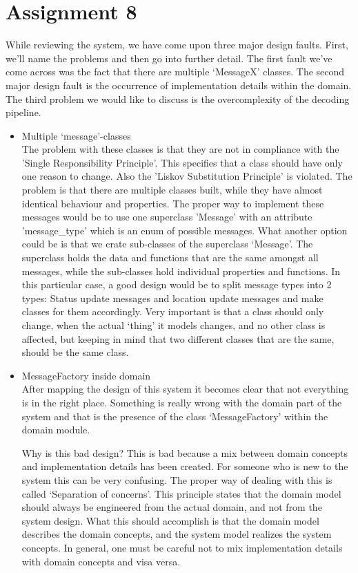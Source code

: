 \documentclass[12pt]{article}
\begin{document}
\section*{Assignment 8}
While reviewing the system, we have come upon three major design faults. First, we'll name the problems and then go into further detail. The first fault we've come across was the fact that there are multiple `MessageX' classes. The second major design fault is the occurrence of implementation details within the domain. The third problem we would like to discuss is the overcomplexity of the decoding pipeline.

\begin{itemize}
\item Multiple `message'-classes\\
The problem with these classes is that they are not in compliance with the 'Single Responsibility Principle'. This specifies that a class should have only one reason to change. Also the 'Liskov Substitution Principle'  is violated. The problem is that there are multiple classes built, while they have almost identical behaviour and properties. The proper way to implement these messages would be to use one superclass 'Message' with an attribute 'message\_type' which is an enum of possible messages. What another option could be is that we crate sub-classes of the superclass `Message'. The superclass holds the data and functions that are the same amongst all messages, while the sub-classes hold individual properties and functions. 
In this particular case, a good design would be to split message types into 2 types: Status update messages and location update messages and make classes for them accordingly. Very important is that a class should only change, when the actual `thing' it models changes, and no other class is affected, but keeping in mind that two different classes that are the same, should be the same class.

\item MessageFactory inside domain\\
After mapping the design of this system it becomes clear that not everything is in the right place. Something is really wrong with the domain part of the system and that is the presence of the class `MessageFactory' within the domain module.

Why is this bad design? 
This is bad because a mix between domain concepts and implementation details has been created. For someone who is new to the system this can be very confusing. The proper way of dealing with this is called `Separation of concerns'. This principle states that the domain model should always be engineered from the actual domain, and not from the system design. What this should accomplish is that the domain model describes the domain concepts, and the system model realizes the system concepts. In general, one must be careful not to mix implementation details with domain concepts and visa versa.


\end{itemize}
\end{document}
